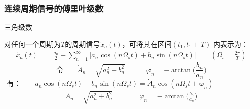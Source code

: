 \documentclass[notheorems,compress,mathserif,table]{beamer}
\begin{document}
\begin{frame}[shrink]\frametitle{连续周期信号的傅里叶级数}%

   三角级数 \par

        对任何一个周期为$T$的周期信号$\tilde{x}_a(t)$，可将其在区间$(t_1,t_1+T)$ 内表示为：
        \begin{equation*}
          \begin{split}
            \tilde{x}_a(t) &=
                     \frac{a_0}{2}+\sum_{n=1}^{\infty}\Big[a_n \cos(n \Omega_s t)+
                        b_n \sin(n \Omega_s t)\Big]\quad\quad \left(\Omega_s = \frac{2\pi}{T}\right)
           \end{split}
        \end{equation*}
               $$\mbox{令}\quad\quad \dot{A}_n = \sqrt{a^2_n +b^2_n}\qquad\quad    \varphi_n = - \arctan\Big(\frac{b_n}{a_n}\Big) $$
       $$\mbox{有：}\quad\quad          a_n \cos(n \Omega_s t)+ b_n \sin(n\Omega_s t) = \dot{A}_n \cos(n \Omega_s t +\varphi_n) \qquad\qquad\quad\quad $$
       \begin{equation*}
       \begin{split}
       \dot{A}_n = \sqrt{a^2_n +b^2_n}\qquad      &\quad    \varphi_n = - \arctan\Big(\frac{b_n}{a_n}\Big)
       \end{split}
       \end{equation*}
\end{frame}
\end{document}
